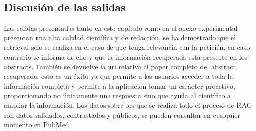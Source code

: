 \subsection{Discusión de las salidas}

Las salidas presentadas tanto en este capítulo como en el anexo experimental presentan una alta calidad científica y de redacción, se ha demostrado que el retrieval sólo se realiza en el caso de que tenga relevancia con la petición, en caso contrario se informa de ello y que la información recuperada está presente en los abstracts. También se devuelve la url relativa al paper completo del abstract recuperado, esto es un éxito ya que permite a los usuarios acceder a toda la información completa y permite a la aplicación tomar un carácter proactivo, proporcionando no únicamente una respuesta sino que ayuda al científico a ampliar la información. Los datos sobre los que se realiza todo el proceso de RAG son datos validados, contrastados y públicos, se pueden consultar en cualquier momento en PubMed. 